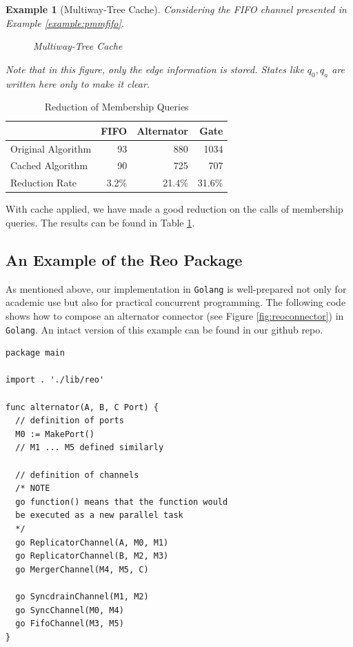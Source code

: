 \documentclass[conference, a4paper]{IEEEtran}
\newtheorem{example}{Example}
\begin{document}
\begin{example}[Multiway-Tree Cache]
  \label{example:tree}
  Considering the FIFO channel presented in Example \ref{example:pmmfifo}. 
  \begin{figure}[h]
    \begin{center}
      
    \end{center}
    \caption{Multiway-Tree Cache}
    \label{fig:multiway}
  \end{figure}
  Note that in this figure, only the edge information is stored. States like $q_0,q_a$ are written
  here only to make it clear.
\end{example}

\begin{table}[h]
  \renewcommand{\arraystretch}{1.3}
  \caption{Reduction of Membership Queries}
  \label{tabel:cacheoptimization}
  \centering
  \begin{tabular}{l||rrr}
    \hline
    & FIFO & Alternator & Gate \\
    \hline\hline
    Original Algorithm & 93 & 880 & 1034 \\
    Cached Algorithm & 90 & 725 & 707 \\
    Reduction Rate & 3.2\% & 21.4\% & 31.6\% \\
    \hline
  \end{tabular}
\end{table}

With cache applied, we have made a good reduction on the calls of membership queries. The results
can be found in Table \ref{tabel:cacheoptimization}.

\subsection{An Example of the Reo Package }
\label{sec:reolib}

As mentioned above, our implementation in \texttt{Golang} is well-prepared not only for academic use
but also for practical concurrent programming. The following code shows how to compose an alternator
connector (see Figure \ref{fig:reoconnector}) in \texttt{Golang}. An intact version of this example can be found in our github repo.

\begin{lstlisting}
package main

import . './lib/reo'

func alternator(A, B, C Port) {
  // definition of ports
  M0 := MakePort()
  // M1 ... M5 defined similarly

  // definition of channels
  /* NOTE
  go function() means that the function would
  be executed as a new parallel task
  */
  go ReplicatorChannel(A, M0, M1)
  go ReplicatorChannel(B, M2, M3)
  go MergerChannel(M4, M5, C)

  go SyncdrainChannel(M1, M2)
  go SyncChannel(M0, M4)
  go FifoChannel(M3, M5)
}
\end{lstlisting}
\end{document}
